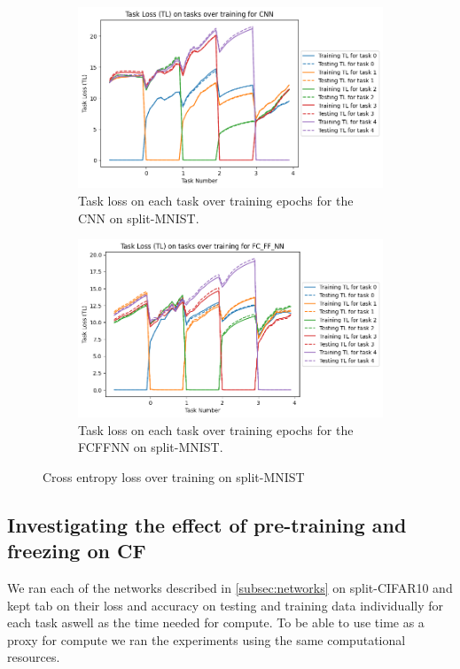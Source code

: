 \begin{figure}[htbp]
    \centering
    \begin{subfigure}[t]{0.45\linewidth}
      \centering
      \includegraphics[width=\textwidth]{images/MNIST_CL/CNN_TL_task.png}
      \caption{Task loss on each task over training epochs for the CNN on split-MNIST.}
      \label{fig:MNIST-CL-CNN-TL}
    \end{subfigure}
    \hspace{0.5cm}
    \begin{subfigure}[t]{0.45\linewidth}
      \centering
      \includegraphics[width=\textwidth]{images/MNIST_CL/FC_FF_NN_TL_task.png}
      \caption{Task loss on each task over training epochs for the FCFFNN on split-MNIST.}
      \label{fig:MNIST-CL-FCFFNN-TL}
    \end{subfigure}
    \caption{Cross entropy loss over training on split-MNIST}
    \label{fig:MNIST-CL-TL}
\end{figure}

\FloatBarrier
\subsection{Investigating the effect of pre-training and freezing on CF}
\label{sec:pretrain-freeze}
We ran each of the networks described in \cref{subsec:networks} on split-CIFAR10 and kept tab on their loss and accuracy on testing and training data individually for each task aswell as the time needed for compute. To be able to use time as a proxy for compute we ran the experiments using the same computational resources. 

